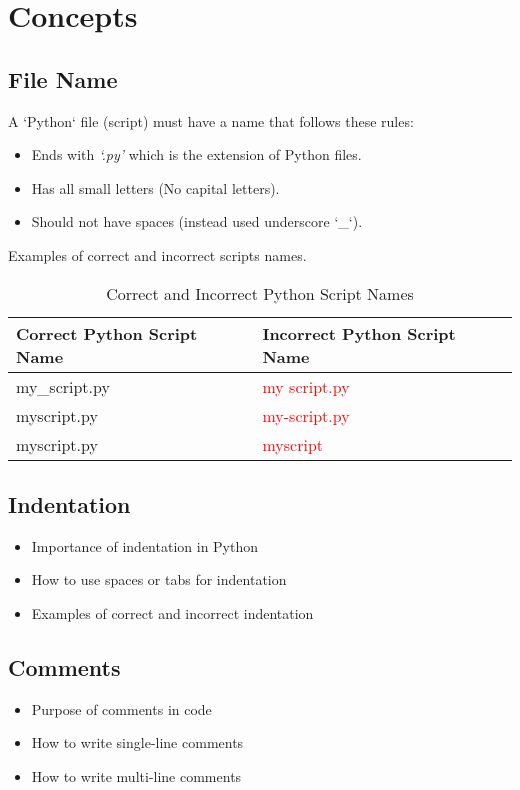 \section{Concepts}

\subsection{File Name}
A `Python` file (script) must have a name that follows these rules:
\begin{itemize}
    \item Ends with \textit{`.py'} which is the extension of Python files.
    \item Has all small letters (No capital letters).
    \item Should not have spaces (instead used underscore `\_`).
\end{itemize}

Examples of correct and incorrect scripts names.
\begin{table}[h!]
    \centering
    \begin{tabular}{|l|l|}
    \hline
    \textbf{Correct Python Script Name} & \textbf{Incorrect Python Script Name} \\ \hline
    my\_script.py & \textcolor{red}{my script.py} \\ \hline
    myscript.py & \textcolor{red}{my-script.py} \\ \hline
    myscript.py & \textcolor{red}{myscript} \\ \hline
    \end{tabular}
    \caption{Correct and Incorrect Python Script Names}
    \label{tab:script_name}
    \end{table}

\subsection{Indentation}
\begin{itemize}
    \item Importance of indentation in Python
    \item How to use spaces or tabs for indentation
    \item Examples of correct and incorrect indentation
\end{itemize}

\subsection{Comments}
\begin{itemize}
    \item Purpose of comments in code
    \item How to write single-line comments
    \item How to write multi-line comments
\end{itemize}


